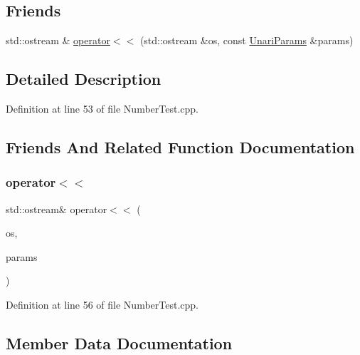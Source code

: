 \subsection*{Friends}
\begin{DoxyCompactItemize}
\item 
std\+::ostream \& \hyperlink{struct_unari_params_a45b95d770513e8cfe4385f18085715df}{operator$<$$<$} (std\+::ostream \&os, const \hyperlink{struct_unari_params}{Unari\+Params} \&params)
\end{DoxyCompactItemize}


\subsection{Detailed Description}


Definition at line 53 of file Number\+Test.\+cpp.



\subsection{Friends And Related Function Documentation}
\mbox{\label{struct_unari_params_a45b95d770513e8cfe4385f18085715df}} 
\subsubsection{\texorpdfstring{operator$<$$<$}{operator<<}}
{\footnotesize\ttfamily std\+::ostream\& operator$<$$<$ (\begin{DoxyParamCaption}\item[{std\+::ostream \&}]{os,  }\item[{const \hyperlink{struct_unari_params}{Unari\+Params} \&}]{params }\end{DoxyParamCaption})\hspace{0.3cm}{\ttfamily [friend]}}



Definition at line 56 of file Number\+Test.\+cpp.



\subsection{Member Data Documentation}
\mbox{\label{struct_unari_params_a4ea568291d8eb7ad9431e8457787d25f}} 

